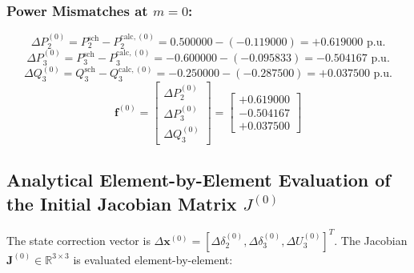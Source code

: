 \documentclass[12pt,a4paper,oneside]{report}
\begin{document}
\subsubsection{Power Mismatches at $m = 0$:}
\begin{equation}
\Delta P_2^{(0)} = P_2^{\text{sch}} - P_2^{\text{calc},(0)} = 0.500000 - (-0.119000) = +0.619000\text{ p.u.}
\end{equation}
\begin{equation}
\Delta P_3^{(0)} = P_3^{\text{sch}} - P_3^{\text{calc},(0)} = -0.600000 - (-0.095833) = -0.504167\text{ p.u.}
\end{equation}
\begin{equation}
\Delta Q_3^{(0)} = Q_3^{\text{sch}} - Q_3^{\text{calc},(0)} = -0.250000 - (-0.287500) = +0.037500\text{ p.u.}
\end{equation}
\begin{equation}
\mathbf{f}^{(0)} = \begin{bmatrix} \Delta P_2^{(0)} \\ \Delta P_3^{(0)} \\ \Delta Q_3^{(0)} \end{bmatrix} = \begin{bmatrix} +0.619000 \\ -0.504167 \\ +0.037500 \end{bmatrix}
\end{equation}

\subsection{Analytical Element-by-Element Evaluation of the Initial Jacobian Matrix $J^{(0)}$}
The state correction vector is $\Delta \mathbf{x}^{(0)} = [\Delta \delta_2^{(0)}, \Delta \delta_3^{(0)}, \Delta U_3^{(0)}]^T$. The Jacobian $\mathbf{J}^{(0)} \in \mathbb{R}^{3 \times 3}$ is evaluated element-by-element:
\end{document}
